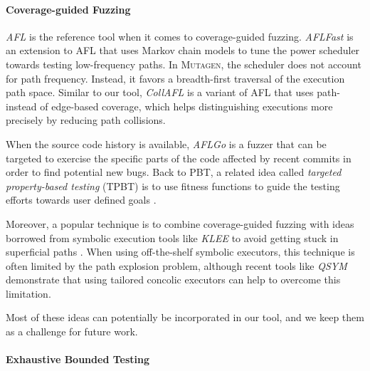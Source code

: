 \documentclass[acmsmall, anonymous]{acmart}
\newcommand{\mutagen}{\textsc{Mutagen}\xspace}
\begin{document}
\paragraph{Coverage-guided Fuzzing}

\emph{AFL} \cite{afl} is the reference tool when it comes to coverage-guided
fuzzing.
%
\emph{AFLFast} \cite{bohme2017coverage} is an extension to AFL that uses Markov
chain models to tune the power scheduler towards testing low-frequency paths.
%
In \mutagen, the scheduler does not account for path frequency.
%
Instead, it favors a breadth-first traversal of the execution path space.
%
Similar to our tool, \emph{CollAFL} \cite{gan2018collafl} is a variant of AFL
that uses path- instead of edge-based coverage, which helps distinguishing
executions more precisely by reducing path collisions.

When the source code history is available, \emph{AFLGo} \cite{bohme2017directed}
is a fuzzer that can be targeted to exercise the specific parts of the code
affected by recent commits in order to find potential new bugs.
%
Back to PBT, a related idea called \emph{targeted property-based testing} (TPBT)
is to use fitness functions to guide the testing efforts towards user defined
goals \cite{loscher2017targeted, loscher2018automating}.


%
Moreover, a popular technique is to combine coverage-guided fuzzing with ideas
borrowed from symbolic execution tools like \emph{KLEE} \cite{cadar2008klee} to
avoid getting stuck in superficial paths \cite{stephens2016driller}.
%
When using off-the-shelf symbolic executors, this technique is often limited by
the path explosion problem, although recent tools like \emph{QSYM}
\cite{yun2018qsym} demonstrate that using tailored concolic executors can help
to overcome this limitation.


Most of these ideas can potentially be incorporated in our tool, and we keep
them as a challenge for future work.


\paragraph{Exhaustive Bounded Testing}
\end{document}
